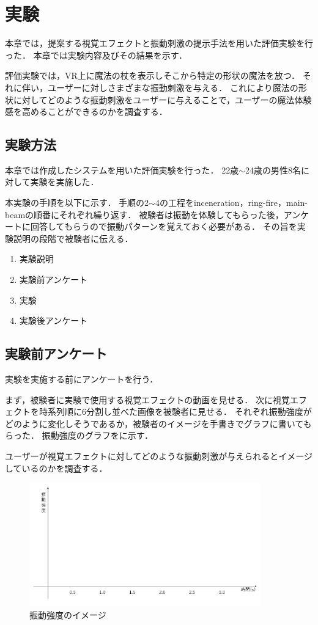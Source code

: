 \chapter{実験}
本章では，提案する視覚エフェクトと振動刺激の提示手法を用いた評価実験を行った．
本章では実験内容及びその結果を示す．

評価実験では，VR上に魔法の杖を表示しそこから特定の形状の魔法を放つ．
それに伴い，ユーザーに対しさまざまな振動刺激を与える．
これにより魔法の形状に対してどのような振動刺激をユーザーに与えることで，ユーザーの魔法体験感を高めることができるのかを調査する．

\section{実験方法}
本章では作成したシステムを用いた評価実験を行った．
22歳$\sim$24歳の男性8名に対して実験を実施した．

本実験の手順を以下に示す．
手順の2$\sim$4の工程をinceneration，ring-fire，main-beamの順番にそれぞれ繰り返す．
被験者は振動を体験してもらった後，アンケートに回答してもらうので振動パターンを覚えておく必要がある．
その旨を実験説明の段階で被験者に伝える．

\begin{enumerate}
    \item 実験説明
    \item 実験前アンケート
    \item 実験
    \item 実験後アンケート
\end{enumerate}

\newpage
\section{実験前アンケート}
実験を実施する前にアンケートを行う．

まず，被験者に実験で使用する視覚エフェクトの動画を見せる．
次に視覚エフェクトを時系列順に6分割し並べた画像を被験者に見せる．
それぞれ振動強度がどのように変化しそうであるか，被験者のイメージを手書きでグラフに書いてもらった．
振動強度のグラフをに示す．

ユーザーが視覚エフェクトに対してどのような振動刺激が与えられるとイメージしているのかを調査する．

\begin{figure}[h]
\centering
\includegraphics[clip,width=10cm]{./fig/ank.png}
\caption{振動強度のイメージ}\label{ank}
\end{figure}

